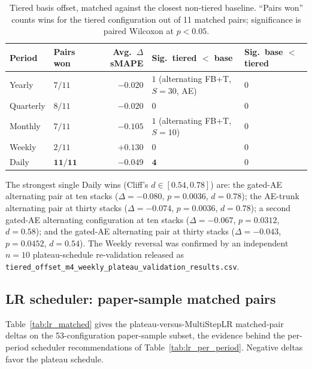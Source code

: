 \begin{table}[h]
\centering
\small
\caption{Tiered basis offset, matched against the closest non-tiered
baseline. ``Pairs won'' counts wins for the tiered configuration out of 11
matched pairs; significance is paired Wilcoxon at $p < 0.05$.}
\label{tab:tiered_per_period}
\begin{tabular}{@{}llrll@{}}
\toprule
Period & Pairs won & Avg.\ $\Delta$ sMAPE & Sig.\ tiered $<$ base & Sig.\ base $<$ tiered \\
\midrule
Yearly    & $7/11$ & $-0.020$ & $1$ (alternating FB+T, $S{=}30$, AE) & $0$ \\
Quarterly & $8/11$ & $-0.020$ & $0$ & $0$ \\
Monthly   & $7/11$ & $-0.105$ & $1$ (alternating FB+T, $S{=}10$) & $0$ \\
Weekly    & $2/11$ & $\mathbf{+0.130}$ & $0$ & $0$ \\
Daily     & $\mathbf{11/11}$ & $\mathbf{-0.049}$ & $\mathbf{4}$ & $0$ \\
\bottomrule
\end{tabular}
\end{table}

The strongest single Daily wins (Cliff's $d \in [0.54, 0.78]$) are: the
gated-AE alternating pair at ten stacks ($\Delta = -0.080$, $p = 0.0036$,
$d = 0.78$); the AE-trunk alternating pair at thirty stacks
($\Delta = -0.074$, $p = 0.0036$, $d = 0.78$); a second gated-AE
alternating configuration at ten stacks ($\Delta = -0.067$,
$p = 0.0312$, $d = 0.58$); and the gated-AE alternating pair at thirty
stacks ($\Delta = -0.043$, $p = 0.0452$, $d = 0.54$). The Weekly reversal
was confirmed by an independent $n = 10$ plateau-schedule re-validation
released as \texttt{tiered\_offset\_m4\_weekly\_plateau\_validation\_results.csv}.

\subsection{LR scheduler: paper-sample matched pairs}
\label{app:ablations:lr}

Table~\ref{tab:lr_matched} gives the plateau-versus-MultiStepLR matched-pair
deltas on the 53-configuration paper-sample subset, the evidence behind the
per-period scheduler recommendations of Table~\ref{tab:lr_per_period}.
Negative deltas favor the plateau schedule.

